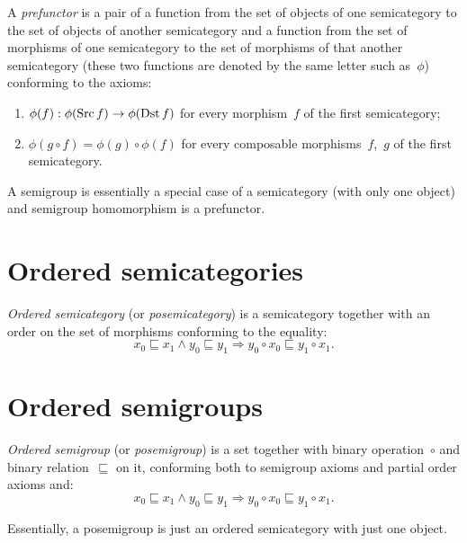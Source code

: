 \begin{defn}
A \emph{prefunctor} is a pair of a function from the set of objects of one semicategory to the set of objects of another semicategory and a function from the set of morphisms of one semicategory to the set of morphisms of that another semicategory (these two functions are denoted by the same letter such as~$\phi$) conforming to the axioms:
\begin{enumerate}
\item $\phi(f): \phi(\operatorname{Src} f)\to\phi(\operatorname{Dst} f)$ for every morphism~$f$ of the first semicategory;
\item $\phi(g\circ f)=\phi(g)\circ\phi(f)$ for every composable morphisms~$f$,~$g$ of the first semicategory.
\end{enumerate}
\end{defn}

\begin{note}
A semigroup is essentially a special case of a semicategory (with only one object) and semigroup homomorphism is a prefunctor.
\end{note}

\chapter{Ordered semicategories}

\begin{defn}
\emph{Ordered semicategory} (or \emph{posemicategory}) is
a semicategory together with an order on the set of morphisms conforming to the equality:
\[ x_0\sqsubseteq x_1\land y_0\sqsubseteq y_1\Rightarrow y_0\circ x_0\sqsubseteq y_1\circ x_1. \]
\end{defn}

\chapter{Ordered semigroups}

\begin{defn}
\emph{Ordered semigroup} (or \emph{posemigroup}) is a set together with binary operation~$\circ$ and binary relation~$\sqsubseteq$ on it, conforming both to semigroup axioms and partial order axioms and:
\[ x_0\sqsubseteq x_1\land y_0\sqsubseteq y_1\Rightarrow y_0\circ x_0\sqsubseteq y_1\circ x_1. \]
\end{defn}

Essentially, a posemigroup is just an ordered semicategory with just one object.

